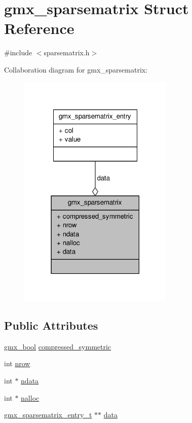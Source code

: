 \hypertarget{structgmx__sparsematrix}{\section{gmx\-\_\-sparsematrix \-Struct \-Reference}
\label{structgmx__sparsematrix}
}


{\ttfamily \#include $<$sparsematrix.\-h$>$}



\-Collaboration diagram for gmx\-\_\-sparsematrix\-:
\nopagebreak
\begin{figure}[H]
\begin{center}
\leavevmode
\includegraphics[width=210pt]{structgmx__sparsematrix__coll__graph}
\end{center}
\end{figure}
\subsection*{\-Public \-Attributes}
\begin{DoxyCompactItemize}
\item 
\hyperlink{include_2types_2simple_8h_a8fddad319f226e856400d190198d5151}{gmx\-\_\-bool} \hyperlink{structgmx__sparsematrix_a8417fbdb655600b4b781f7093ced07a0}{compressed\-\_\-symmetric}
\item 
int \hyperlink{structgmx__sparsematrix_a66c709f29fa9eff4bb76349c3e25fc5e}{nrow}
\item 
int $\ast$ \hyperlink{structgmx__sparsematrix_ad06fd8f1a38b2b83edeb903dccc65728}{ndata}
\item 
int $\ast$ \hyperlink{structgmx__sparsematrix_a872f9f6e085b1431a7cfc54ec8ec97b7}{nalloc}
\item 
\hyperlink{include_2sparsematrix_8h_a54641be08c4a38f8e92681954751ae7b}{gmx\-\_\-sparsematrix\-\_\-entry\-\_\-t} $\ast$$\ast$ \hyperlink{structgmx__sparsematrix_abe31d2a420da18631f73fc5e29976250}{data}
\end{DoxyCompactItemize}


